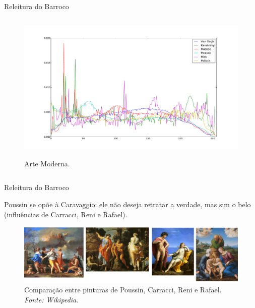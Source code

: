 \documentclass{beamer}
\begin{document}
\begin{frame}{Releitura do Barroco}
\begin{columns}
\begin{column}{.6\textwidth}
\begin{figure}[h!]
\begin{center}
{    \centering
        \includegraphics[width=\columnwidth]{figs/chiaroscuro_modernos}}
      \caption{Arte Moderna.}
        \label{fig:chiaroscuro_modernos}
  \end{center}
\end{figure}
  \end{column}
\end{columns}

\end{frame}



\begin{frame}{Releitura do Barroco}

Poussin se opõe à Caravaggio: ele não deseja retratar a verdade, 
mas sim o belo (influências de Carracci, Reni e Rafael).

\begin{figure}[h!]
  \begin{center}
    \includegraphics[width=1.0\textwidth]{figs/compara_poussin.png}
    \caption{Comparação entre pinturas de Poussin, Carracci, Reni e Rafael. \textit{Fonte: Wikipedia}.}
\end{center}
\end{figure}

\end{frame}
\end{document}
